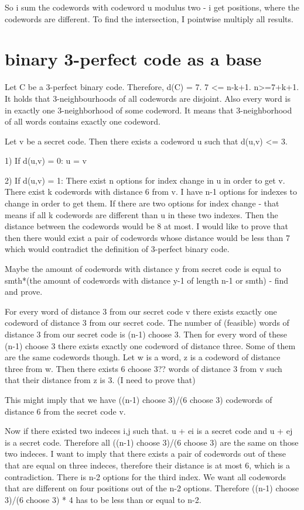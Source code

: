 So i sum the codewords with codeword u modulus two - i get positions, where the codewords are different. To find the intersection, I pointwise multiply all results.

\section{binary 3-perfect code as a base}
Let C be a 3-perfect binary code. Therefore, d(C) = 7. 7 <= n-k+1. n>=7+k+1. It holds that 3-neighbourhoods of all codewords are disjoint. Also every word is in exactly one 3-neighborhood of some codeword. It means that 3-neighborhood of all words contains exactly one codeword. 

Let v be a secret code. Then there exists a codeword u such that d(u,v) <= 3.

1) If d(u,v) = 0: u = v

2) If d(u,v) = 1: 
There exist n options for index change in u in order to get v. There exist k codewords with distance 6 from v. I have n-1 options for indexes to change in order to get them. 
If there are two options for index change - that means if all k codewords are different than u in these two indexes. Then the distance between the codewords would be 8 at most. I would like to prove that then there would exist a pair of codewords whose distance would be less than 7 which would contradict the definition of 3-perfect binary code.

Maybe the amount of codewords with distance y from secret code is equal to smth*(the amount of codewords with distance y-1 of length n-1 or smth) - find and prove. 

For every word of distance 3 from our secret code v there exists exactly one codeword of distance 3 from our secret code. The number of (feasible) words of distance 3 from our secret code is (n-1) choose 3. Then for every word of these (n-1) choose 3 there exists exactly one codeword of distance three. Some of them are the same codewords though. Let w is a word, z is a codeword of distance three from w. Then there exists 6 choose 3?? words of distance 3 from v such that their distance from z is 3. (I need to prove that)

This might imply that we have ((n-1) choose 3)/(6 choose 3) codewords of distance 6 from the secret code v. 

Now if there existed two indeces i,j such that. u + ei is a secret code and u + ej is a secret code. Therefore all ((n-1) choose 3)/(6 choose 3) are the same on those two indeces. I want to imply that there exists a pair of codewords out of these that are equal on three indeces, therefore their distance is at most 6, which is a contradiction. There is n-2 options for the third index. We want all codewords that are different on four positions out of the n-2 options. Therefore ((n-1) choose 3)/(6 choose 3) * 4 has to be less than or equal to n-2. 

